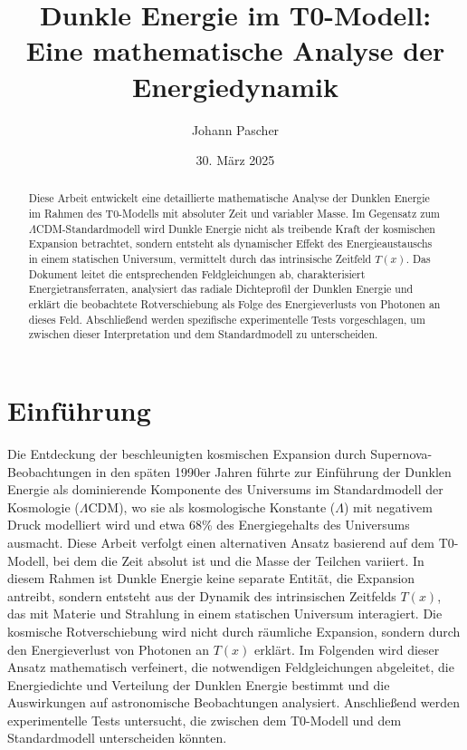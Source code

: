 \documentclass[a4paper,12pt]{article}
\theoremstyle{definition}
\theoremstyle{remark}
\newcommand{\Tfield}{T(x)} %
\begin{document}
	
	\title{Dunkle Energie im T0-Modell: \\Eine mathematische Analyse der Energiedynamik}
	\author{Johann Pascher}
	\date{30. März 2025}
	\maketitle
	
	\begin{abstract}
		Diese Arbeit entwickelt eine detaillierte mathematische Analyse der Dunklen Energie im Rahmen des T0-Modells mit absoluter Zeit und variabler Masse. Im Gegensatz zum \(\Lambda\)CDM-Standardmodell wird Dunkle Energie nicht als treibende Kraft der kosmischen Expansion betrachtet, sondern entsteht als dynamischer Effekt des Energieaustauschs in einem statischen Universum, vermittelt durch das intrinsische Zeitfeld \(\Tfield\). Das Dokument leitet die entsprechenden Feldgleichungen ab, charakterisiert Energietransferraten, analysiert das radiale Dichteprofil der Dunklen Energie und erklärt die beobachtete Rotverschiebung als Folge des Energieverlusts von Photonen an dieses Feld. Abschließend werden spezifische experimentelle Tests vorgeschlagen, um zwischen dieser Interpretation und dem Standardmodell zu unterscheiden.
	\end{abstract}
	
	\tableofcontents
	\newpage
	
	\section{Einführung}
	
	Die Entdeckung der beschleunigten kosmischen Expansion durch Supernova-Beobachtungen in den späten 1990er Jahren führte zur Einführung der Dunklen Energie als dominierende Komponente des Universums im Standardmodell der Kosmologie (\(\Lambda\)CDM), wo sie als kosmologische Konstante (\(\Lambda\)) mit negativem Druck modelliert wird und etwa 68\% des Energiegehalts des Universums ausmacht. Diese Arbeit verfolgt einen alternativen Ansatz basierend auf dem T0-Modell, bei dem die Zeit absolut ist und die Masse der Teilchen variiert. In diesem Rahmen ist Dunkle Energie keine separate Entität, die Expansion antreibt, sondern entsteht aus der Dynamik des intrinsischen Zeitfelds \(\Tfield\), das mit Materie und Strahlung in einem statischen Universum interagiert. Die kosmische Rotverschiebung wird nicht durch räumliche Expansion, sondern durch den Energieverlust von Photonen an \(\Tfield\) erklärt. Im Folgenden wird dieser Ansatz mathematisch verfeinert, die notwendigen Feldgleichungen abgeleitet, die Energiedichte und Verteilung der Dunklen Energie bestimmt und die Auswirkungen auf astronomische Beobachtungen analysiert. Anschließend werden experimentelle Tests untersucht, die zwischen dem T0-Modell und dem Standardmodell unterscheiden könnten.
	
\end{document}
